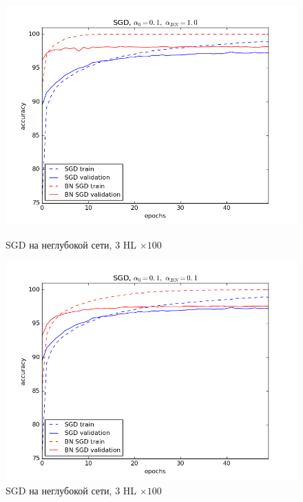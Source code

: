 \documentclass[12pt,oneside]{article}
\begin{document}
\begin{figure}[h!]
\centering
\begin{minipage}{0.45\textwidth}
\includegraphics[scale=0.45]{images/mnistSGD1.png}
\caption{\small SGD на неглубокой сети, $3$ HL $\times 100$}
\end{minipage} \hfill
\begin{minipage}{0.45\textwidth}
\includegraphics[scale=0.45]{images/mnistSGD2.png}
\caption{\small SGD на неглубокой сети, $3$ HL $\times 100$}
\end{minipage} \vfill
\begin{minipage}{0.45\textwidth}

\end{minipage}
\end{figure}
\end{document}
